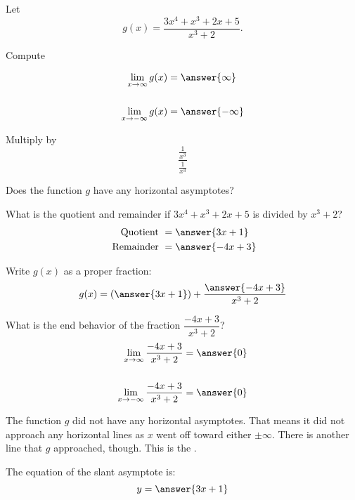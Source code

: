 \documentclass{ximera}
\author{Bobby Ramsey}
\begin{document}
\begin{exercise}
	Let \[ g(x) = \frac{3x^4+x^3+2x+5}{x^3+2}. \]
	
	Compute

	\begin{align*}
		\lim_{x\to \infty} g(x) &= \answer{\infty}\\ \\
		\lim_{x\to -\infty}g(x) &= \answer{-\infty}
	\end{align*}

	\begin{hint}
		Multiply by \[\frac{\frac{1}{x^3}}{\frac{1}{x^3}}\]
	\end{hint}

	\begin{exercise}
		Does the function $g$ have any horizontal asymptotes?
		\begin{multipleChoice}
		\end{multipleChoice}
		
		\begin{exercise}
			What is the quotient and remainder if $3x^4+x^3+2x+5$ is divided by $x^3+2$?
			\begin{align*}
				\text{ Quotient } &= \answer{3x+1}\\
				\text{ Remainder } &= \answer{-4x+3}	
			\end{align*}
			\begin{exercise}
				Write $g(x)$ as a proper fraction:
				\[ g(x) = \left( \answer{3x+1} \right) + \frac{\answer{-4x+3}}{x^3+2} \]
				\begin{exercise}
					What is the end behavior of the fraction $\dfrac{-4x+3}{x^3+2}$?
					\begin{align*}
						\lim_{x\to \infty} \frac{-4x+3}{x^3+2} &= \answer{0} \\ \\
						\lim_{x\to -\infty} \frac{-4x+3}{x^3+2} &= \answer{0} \\
					\end{align*}
					\begin{exercise}
						The function $g$ did not have any horizontal asymptotes.  That means it did not approach any horizontal lines as $x$ went off toward either $\pm \infty$.
						There is another line that $g$ approached, though.  This is the .
						\begin{exercise}	
							The equation of the slant asymptote is:
							\[ y = \answer{3x+1} \]
						\end{exercise}
					\end{exercise}
				\end{exercise}
			\end{exercise}
		\end{exercise}
	\end{exercise}
\end{exercise}
\end{document}
